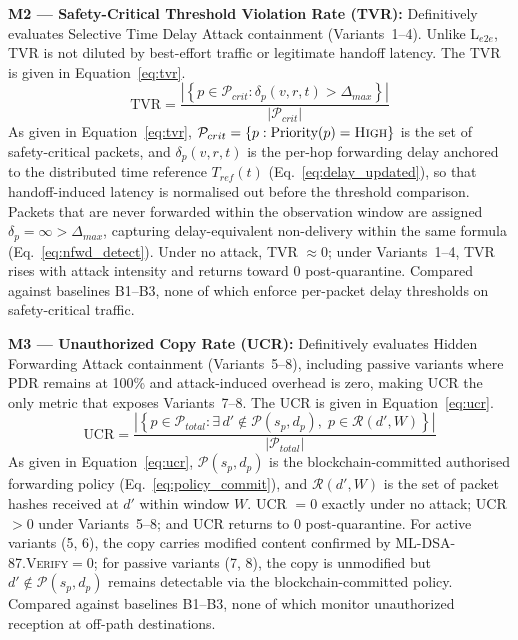 \documentclass[12pt, a4paper]{report}
\begin{document}
{{\textbf{M2 — Safety-Critical Threshold Violation Rate (TVR):}
Definitively evaluates Selective Time Delay Attack
containment (Variants~1--4). Unlike L$_{e2e}$, TVR
is not diluted by best-effort traffic or legitimate
handoff latency. The TVR is given in
Equation~\eqref{eq:tvr}.
\begin{equation}
\text{TVR} =
\frac{\left|\left\{
p \in \mathcal{P}_{crit} :
\delta_p(v,r,t) > \Delta_{max}
\right\}\right|}{|\mathcal{P}_{crit}|}
\label{eq:tvr}
\end{equation}
As given in Equation~\eqref{eq:tvr},
$\mathcal{P}_{crit} = \{p :
\text{Priority}(p) = \textsc{High}\}$ is the set
of safety-critical packets, and $\delta_p(v,r,t)$
is the per-hop forwarding delay anchored to the
distributed time reference $T_{ref}(t)$
(Eq.~\ref{eq:delay_updated}), so that handoff-induced
latency is normalised out before the threshold
comparison. Packets that are never forwarded within
the observation window are assigned $\delta_p =
\infty > \Delta_{max}$, capturing delay-equivalent
non-delivery within the same formula
(Eq.~\ref{eq:nfwd_detect}). Under no attack,
TVR $\approx 0$; under Variants~1--4, TVR rises with
attack intensity and returns toward 0 post-quarantine.
Compared against baselines B1--B3, none of which
enforce per-packet delay thresholds on safety-critical
traffic.



\textbf{M3 — Unauthorized Copy Rate (UCR):}
Definitively evaluates Hidden Forwarding Attack
containment (Variants~5--8), including passive variants
where \ac{PDR} remains at 100\% and attack-induced
overhead is zero, making UCR the only metric that
exposes Variants~7--8. The UCR is given in
Equation~\eqref{eq:ucr}.
\begin{equation}
\text{UCR} =
\frac{\left|\left\{
p \in \mathcal{P}_{total} :
\exists\, d' \notin \mathcal{P}(s_p, d_p),\;
p \in \mathcal{R}(d', W)
\right\}\right|}{|\mathcal{P}_{total}|}
\label{eq:ucr}
\end{equation}
As given in Equation~\eqref{eq:ucr},
$\mathcal{P}(s_p, d_p)$ is the blockchain-committed
authorised forwarding policy (Eq.~\ref{eq:policy_commit}),
and $\mathcal{R}(d', W)$ is the set of packet hashes
received at $d'$ within window $W$. UCR $= 0$ exactly
under no attack; UCR $> 0$ under Variants~5--8;
and UCR returns to 0 post-quarantine. For active
variants (5, 6), the copy carries modified content
confirmed by \textsc{ML-DSA-87.Verify}$= 0$; for
passive variants (7, 8), the copy is unmodified
but $d' \notin \mathcal{P}(s_p, d_p)$ remains
detectable via the blockchain-committed policy.
Compared against baselines B1--B3, none of which
monitor unauthorized reception at off-path destinations.


}}
\end{document}
